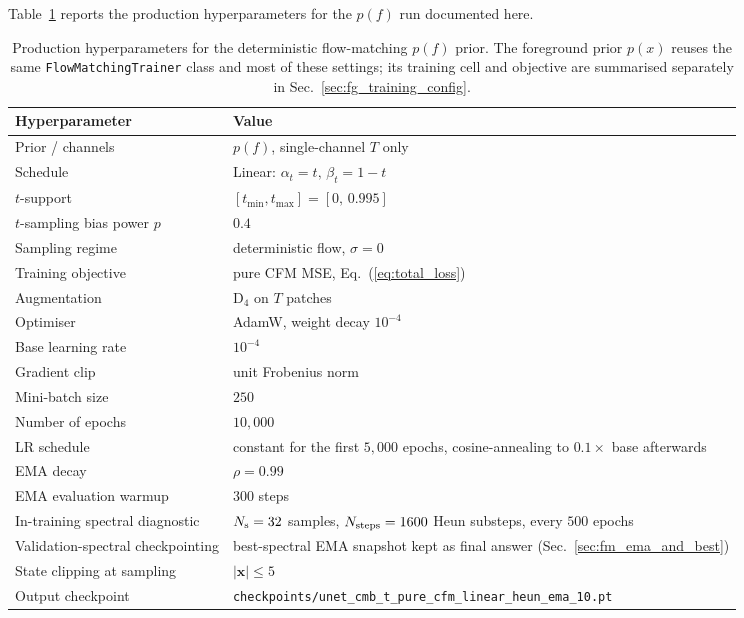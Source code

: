 \documentclass[11pt]{article}
\DeclareRobustCommand{\xvec}{\bm{x}}
\theoremstyle{definition}
\begin{document}
Table~\ref{tab:fm_hparams} reports the production hyperparameters for the $p(f)$ run documented here.

\begin{table}[h]
  \centering
  \begin{tabular}{ll}
    \toprule
    Hyperparameter & Value \\
    \midrule
    Prior / channels & $p(f)$, single-channel $T$ only \\
    Schedule & Linear: $\alpha_t=t,\,\beta_t=1-t$ \\
    $t$-support & $[t_{\min},t_{\max}]=[0,\,0.995]$ \\
    $t$-sampling bias power $p$ & $0.4$ \\
    Sampling regime & deterministic flow, $\sigma=0$ \\
    Training objective & pure CFM MSE, Eq.~(\ref{eq:total_loss}) \\
    Augmentation & $\mathrm{D}_4$ on $T$ patches \\
    Optimiser & AdamW, weight decay $10^{-4}$ \\
    Base learning rate & $10^{-4}$ \\
    Gradient clip & unit Frobenius norm \\
    Mini-batch size & $250$ \\
    Number of epochs & $10{,}000$ \\
    LR schedule & constant for the first $5{,}000$ epochs, cosine-annealing to $0.1\times$ base afterwards \\
    EMA decay & $\rho=0.99$ \\
    EMA evaluation warmup & $300$ steps \\
    In-training spectral diagnostic & $N_{\rm s}=32$ samples, $N_{\rm steps}=1600$ Heun substeps, every $500$ epochs \\
    Validation-spectral checkpointing & best-spectral EMA snapshot kept as final answer (Sec.~\ref{sec:fm_ema_and_best}) \\
    State clipping at sampling & $|\xvec|\!\leq\!5$ \\
    Output checkpoint & \texttt{checkpoints/unet\_cmb\_t\_pure\_cfm\_linear\_heun\_ema\_10.pt} \\
    \bottomrule
  \end{tabular}
  \caption{Production hyperparameters for the deterministic flow-matching $p(f)$ prior. The foreground prior $p(x)$ reuses the same \texttt{FlowMatchingTrainer} class and most of these settings; its training cell and objective are summarised separately in Sec.~\ref{sec:fg_training_config}.}
  \label{tab:fm_hparams}
\end{table}
\end{document}
